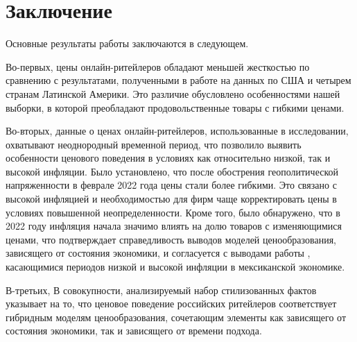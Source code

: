 \chapter*{Заключение}                       %


Основные результаты работы заключаются в следующем.

Во-первых, цены онлайн-ритейлеров обладают меньшей жесткостью по сравнению с результатами, полученными в работе \cite{cavallo2018scraped} на данных по США и четырем странам Латинской Америки. Это различие обусловлено особенностями нашей выборки, в которой преобладают продовольственные товары с гибкими ценами.

Во-вторых, данные о ценах онлайн-ритейлеров, использованные в исследовании, охватывают неоднородный временной период, что позволило выявить особенности ценового поведения в условиях как относительно низкой, так и высокой инфляции. Было установлено, что после обострения геополитической напряженности в феврале 2022 года цены стали более гибкими. Это связано с высокой инфляцией и необходимостью для фирм чаще корректировать цены в условиях повышенной неопределенности. Кроме того, было обнаружено, что в 2022 году инфляция начала значимо влиять на долю товаров с изменяющимися ценами, что подтверждает справедливость выводов моделей ценообразования, зависящего от состояния экономики, и согласуется с выводами работы \cite{gagnon2009}, касающимися периодов низкой и высокой инфляции в мексиканской экономике.

В-третьих, В совокупности, анализируемый набор стилизованных фактов указывает на то, что ценовое поведение российских ритейлеров соответствует гибридным моделям ценообразования, сочетающим элементы как зависящего от состояния экономики, так и зависящего от времени подхода.
%
%
